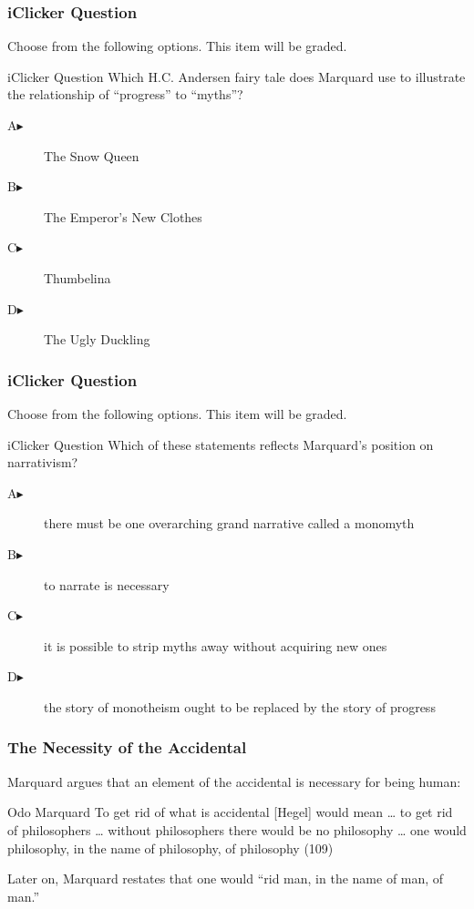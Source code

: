 \documentclass[xcolor=dvipsnames]{beamer}
\begin{document}
\begin{frame}
  \frametitle{iClicker Question}
Choose from the following options. This item will be graded.
\begin{block}{iClicker Question}
Which H.C. Andersen fairy tale does Marquard use to illustrate the
relationship of ``progress'' to ``myths''?
\end{block}
\begin{description}
\item[A\hspace{.2in}$\blacktriangleright$] The Snow Queen
\item[B\hspace{.2in}$\blacktriangleright$] The Emperor's New Clothes
\item[C\hspace{.2in}$\blacktriangleright$] Thumbelina
\item[D\hspace{.2in}$\blacktriangleright$] The Ugly Duckling
\end{description}
\end{frame}

\begin{frame}
  \frametitle{iClicker Question}
Choose from the following options. This item will be graded.
\begin{block}{iClicker Question}
Which of these statements reflects Marquard's position on narrativism?
\end{block}
\begin{description}
\item[A\hspace{.2in}$\blacktriangleright$] there must be one
  overarching grand narrative called a monomyth
\item[B\hspace{.2in}$\blacktriangleright$] to narrate is necessary
\item[C\hspace{.2in}$\blacktriangleright$] it is possible to strip
  myths away without acquiring new ones
\item[D\hspace{.2in}$\blacktriangleright$] the story of monotheism
  ought to be replaced by the story of progress
\end{description}
\end{frame}

\begin{frame}
  \frametitle{The Necessity of the Accidental}
  Marquard argues that an element of the accidental is necessary for
  being human: 
  \begin{block}{Odo Marquard}
    To get rid of what is accidental [Hegel] would mean {\ldots} to
    get rid of philosophers {\ldots} without philosophers there would
    be no philosophy {\ldots} one would philosophy, in the name of
    philosophy, of philosophy (109)
  \end{block}
Later on, Marquard restates that one would ``rid man, in the name of
man, of man.''
\end{frame}
\end{document}
